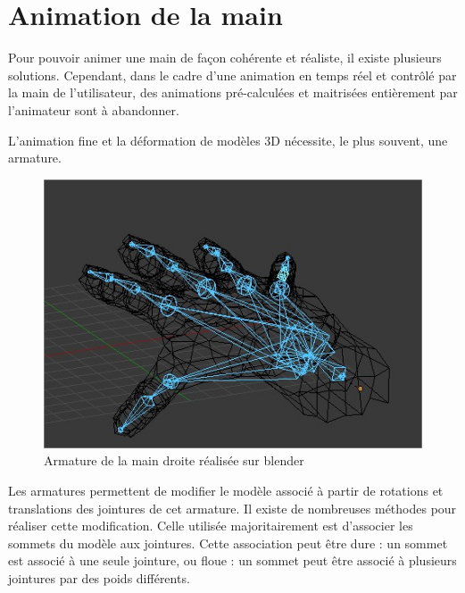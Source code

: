 

\section{Animation de la main}
	
Pour pouvoir animer une main de façon cohérente et réaliste, il existe plusieurs solutions. 
Cependant, dans le cadre d'une animation en temps réel et contrôlé par la main de l'utilisateur, des animations pré-calculées et maitrisées entièrement par l'animateur sont à abandonner.

L'animation fine et la déformation de modèles 3D nécessite, le plus souvent, une armature.\newline

\begin{figure}[!h]
	\centering
	\includegraphics[width=14cm]{images/SkellHand.jpg}
	\caption{Armature de la main droite réalisée sur blender}
\end{figure}

Les armatures permettent de modifier le modèle associé à partir de rotations et translations des jointures de cet armature.
Il existe de nombreuses méthodes pour réaliser cette modification.
Celle utilisée majoritairement est d'associer les sommets du modèle aux jointures. 
Cette association peut être dure : un sommet est associé à une seule jointure, ou floue : un sommet peut être associé à plusieurs jointures par des poids différents.\newline

